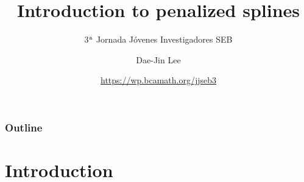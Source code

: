 \documentclass[11pt]{beamer}
\title[Introduction to P-splines]{Introduction to penalized splines}
\subtitle{3$^{\rm a}$ Jornada J\'ovenes Investigadores SEB}
\author[D.-J. Lee]{Dae-Jin Lee}
\institute[BCAM]{\large Basque Center for Applied Mathematics}
\date[{\bf JJSEB 3}]{\url{https://wp.bcamath.org/jjseb3}}
\begin{document}







\begin{frame}
  \titlepage
\end{frame}



% 
% 
% 

\begin{frame}
\frametitle{Outline}
  \tableofcontents
\end{frame}




\section[Introduction]{Introduction}
\end{document}
